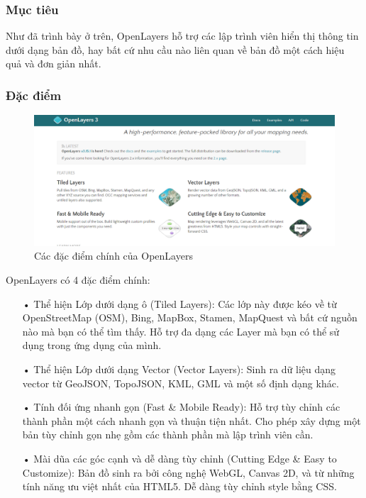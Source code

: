 \documentclass[12pt,a4paper,oneside]{article}
\begin{document}
\subsubsection{Mục tiêu}
Như đã trình bày ở trên, OpenLayers hỗ trợ các lập trình viên hiển thị thông tin dưới dạng bản đồ, hay bất cứ nhu cầu nào liên quan về bản đồ một cách hiệu quả và đơn giản nhất.

\subsubsection{Đặc điểm}
	\begin{center}
    	\begin{figure}[htp]
    		\begin{center}
     		\includegraphics[scale=.4]{image/ol-feature}
    		\end{center}
    	\caption{Các đặc điểm chính của OpenLayers}
    	\label{refhinh15}
    	\end{figure}
	\end{center}
OpenLayers có 4 đặc điểm chính:
\begin{itemize}
\item[•]Thể hiện Lớp dưới dạng ô (Tiled Layers): 
Các lớp này được kéo về từ OpenStreetMap (OSM), Bing, MapBox, Stamen, MapQuest và bất cứ nguồn nào mà bạn có thể tìm thấy. Hỗ trợ đa dạng các Layer mà bạn có thể sử dụng trong ứng dụng của mình.

\item[•]Thể hiện Lớp dưới dạng Vector (Vector Layers):
Sinh ra dữ liệu dạng vector từ GeoJSON, TopoJSON, KML, GML và một số định dạng khác.

\item[•]Tính đối ứng nhanh gọn (Fast \& Mobile Ready):
Hỗ trợ tùy chỉnh các thành phần một cách nhanh gọn và thuận tiện nhất. Cho phép xây dựng một bản tùy chỉnh gọn nhẹ gồm các thành phần mà lập trình viên cần.

\item[•]Mài dũa các góc cạnh và dễ dàng tùy chỉnh (Cutting Edge \& Easy to Customize):
Bản đồ sinh ra bởi công nghệ WebGL, Canvas 2D, và từ những tính năng ưu việt nhất của HTML5. Dễ dàng tùy chỉnh style bằng CSS.

\end{itemize}
\end{document}
